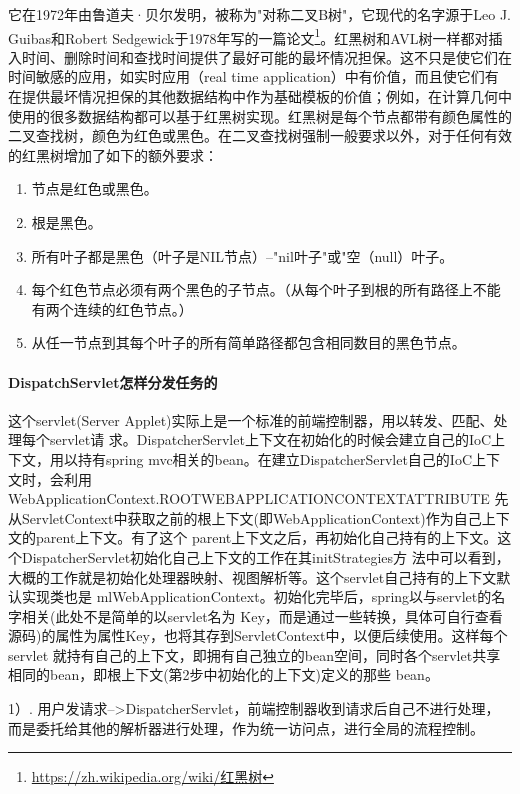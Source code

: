 \documentclass[../../../interview-questions.tex]{subfiles}
\begin{document}
它在1972年由鲁道夫·贝尔发明，被称为"对称二叉B树"，它现代的名字源于Leo J. Guibas和Robert Sedgewick于1978年写的一篇论文\footnote{\url{https://zh.wikipedia.org/wiki/红黑树}}。红黑树和AVL树一样都对插入时间、删除时间和查找时间提供了最好可能的最坏情况担保。这不只是使它们在时间敏感的应用，如实时应用（real time application）中有价值，而且使它们有在提供最坏情况担保的其他数据结构中作为基础模板的价值；例如，在计算几何中使用的很多数据结构都可以基于红黑树实现。红黑树是每个节点都带有颜色属性的二叉查找树，颜色为红色或黑色。在二叉查找树强制一般要求以外，对于任何有效的红黑树增加了如下的额外要求：

\begin{enumerate}
\item {节点是红色或黑色。}
\item{根是黑色。}
\item{所有叶子都是黑色（叶子是NIL节点）--"nil叶子"或"空（null）叶子。}
\item{每个红色节点必须有两个黑色的子节点。（从每个叶子到根的所有路径上不能有两个连续的红色节点。）}
\item{从任一节点到其每个叶子的所有简单路径都包含相同数目的黑色节点。}
\end{enumerate}

\paragraph{DispatchServlet怎样分发任务的}

这个servlet(Server Applet)实际上是一个标准的前端控制器，用以转发、匹配、处理每个servlet请 求。DispatcherServlet上下文在初始化的时候会建立自己的IoC上下文，用以持有spring mvc相关的bean。在建立DispatcherServlet自己的IoC上下文时，会利用WebApplicationContext.ROOTWEBAPPLICATIONCONTEXTATTRIBUTE 先从ServletContext中获取之前的根上下文(即WebApplicationContext)作为自己上下文的parent上下文。有了这个 parent上下文之后，再初始化自己持有的上下文。这个DispatcherServlet初始化自己上下文的工作在其initStrategies方 法中可以看到，大概的工作就是初始化处理器映射、视图解析等。这个servlet自己持有的上下文默认实现类也是 mlWebApplicationContext。初始化完毕后，spring以与servlet的名字相关(此处不是简单的以servlet名为 Key，而是通过一些转换，具体可自行查看源码)的属性为属性Key，也将其存到ServletContext中，以便后续使用。这样每个servlet 就持有自己的上下文，即拥有自己独立的bean空间，同时各个servlet共享相同的bean，即根上下文(第2步中初始化的上下文)定义的那些 bean。

1）. 用户发请求-->DispatcherServlet，前端控制器收到请求后自己不进行处理，而是委托给其他的解析器进行处理，作为统一访问点，进行全局的流程控制。
\end{document}
